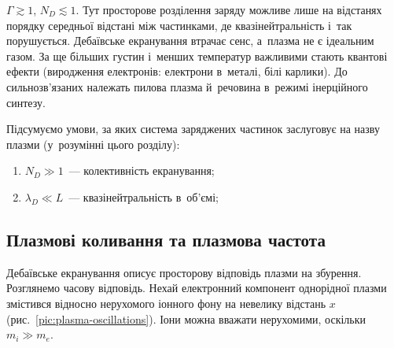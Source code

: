  $\Gamma\gtrsim1$, $N_D\lesssim1$. Тут просторове
розділення заряду можливе лише на відстанях порядку середньої відстані між частинками, де
квазінейтральність і~так порушується. Дебаївське екранування втрачає сенс, а~плазма не є
ідеальним газом. За ще більших густин і~менших температур важливими стають квантові ефекти
(виродження електронів: електрони в~металі, білі карлики). До сильнозв'язаних належать
пилова плазма й~речовина в~режимі інерційного синтезу.

Підсумуємо умови, за яких система заряджених частинок заслуговує на назву плазми
(у~розумінні цього розділу):
\begin{enumerate}
	\item $N_D\gg1$~--- колективність екранування;
	\item $\lambda_D\ll L$~--- квазінейтральність в~об'ємі;
\end{enumerate}



\subsection*{Плазмові коливання та плазмова частота}\label{sec:plasma-oscillations}



Дебаївське екранування описує просторову відповідь плазми на збурення. Розглянемо часову
відповідь. Нехай електронний компонент однорідної плазми змістився відносно нерухомого
іонного фону на невелику відстань $x$ (рис.~\ref{pic:plasma-oscillations}). Іони можна
вважати нерухомими, оскільки $m_i\gg m_e$.

